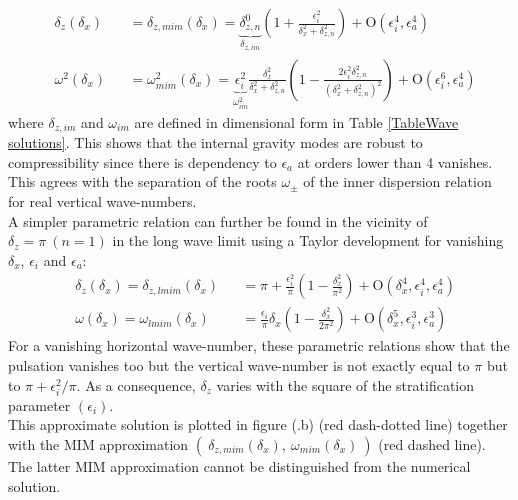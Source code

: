 \documentclass[a4paper,11pt]{article}
\begin{document}
\begin{subequations}
	\begin{alignat}{2}	
	\label{ParamallMIM1}
	&\delta_{z}(\delta_x) &&=\delta_{z,mim}(\delta_x)=
	\underbrace{\delta_{z,n}^0}_{\delta_{z,im}}
	\left(
	1+\frac{\epsilon_i^2}{\delta_x^2+\delta_{z,n}^2}
	\right)
	+\mathrm{O}	(\epsilon_i^4,\epsilon_a^4)\\[3mm]
	\label{ParamallMIM2}
	&\omega^2(\delta_x) &&=\omega_{mim}^2(\delta_x)=
	\underbrace{\epsilon_i^2}
	_{\omega^2_{im}}
	\frac{\delta_x^2}{\delta_x^2+\delta_{z,n}^2}
	\left(1-\frac{2\epsilon_i^2\delta_{z,n}^2}{(\delta_x^2+\delta_{z,n}^2)^2}\right)
	+\mathrm{O}	(\epsilon_i^6,\epsilon_a^4)
	\end{alignat}
\end{subequations}
where $\delta_{z,im}$ and $\omega_{im}$ are defined in dimensional form in Table \ref{TableWave solutions}. This shows that the internal gravity modes are robust to compressibility since there is dependency to $\epsilon_a$ at orders lower than 4 vanishes. This agrees with the separation of the roots $\omega_\pm$ of the inner dispersion relation for real vertical wave-numbers.\\
A simpler parametric relation can further be found in the vicinity of $\delta_z=\pi\ (n=1)$ in the long wave limit using a Taylor development for vanishing $\delta_x$, $\epsilon_i$ and $\epsilon_a$:
\begin{subequations}
	   \label{EqParamInt}
	\begin{alignat}{2}	
	   \label{ParamMIM1}
		& \delta_z(\delta_x)=\delta_{z,lmim}(\delta_x) &&= 
		\pi+\frac{\epsilon_i^2}{\pi} \left(
		1-\frac{\delta_x^2}{\pi^2} \right)
		+\mathrm{O}	(\delta_x^4,\epsilon_i^4,\epsilon_a^4)\\[3mm]
	   \label{ParamMIM2}
		& \omega(\delta_x)=\omega_{lmim}(\delta_x) &&=\frac{\epsilon_i}{\pi} \delta_x
		\left( 1
		-\frac{\delta_x^2}{2\pi^2} \right)
		+\mathrm{O}	(\delta_x^5,\epsilon_i^3,\epsilon_a^3)
	\end{alignat}
\end{subequations}
For a vanishing horizontal wave-number, these parametric relations show that the pulsation vanishes too but the vertical wave-number is not exactly equal to $\pi$ but to $\pi+\epsilon_i^2/\pi$. As a consequence, $\delta_z$ varies with the square of the stratification parameter $(\epsilon_i)$.\\
This approximate solution is plotted in figure (.b) (red dash-dotted line) together with the MIM approximation $(\ \delta_{z,mim}(\delta_x),\ \omega_{mim}(\delta_x)\ )$ (red dashed line). The latter MIM approximation cannot be distinguished from the numerical solution.
\end{document}
